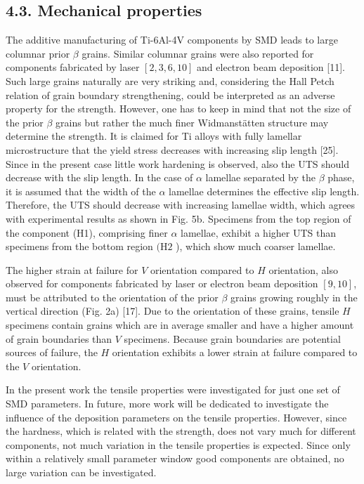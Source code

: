 \documentclass[10pt]{article}
\begin{document}
\subsection*{4.3. Mechanical properties}
The additive manufacturing of Ti-6Al-4V components by SMD leads to large columnar prior $\beta$ grains. Similar columnar grains were also reported for components fabricated by laser $[2,3,6,10]$ and electron beam deposition [11]. Such large grains naturally are very striking and, considering the Hall Petch relation of grain boundary strengthening, could be interpreted as an adverse property for the strength. However, one has to keep in mind that not the size of the prior $\beta$ grains but rather the much finer Widmanstätten structure may determine the strength. It is claimed for Ti alloys with fully lamellar microstructure that the yield stress decreases with increasing slip length [25]. Since in the present case little work hardening is observed, also the UTS should decrease with the slip length. In the case of $\alpha$ lamellae separated by the $\beta$ phase, it is assumed that the width of the $\alpha$ lamellae determines the effective slip length. Therefore, the UTS should decrease with increasing lamellae width, which agrees with experimental results as shown in Fig. 5b. Specimens from the top region of the component (H1), comprising finer $\alpha$ lamellae, exhibit a higher UTS than specimens from the bottom region $(\mathrm{H} 2$ ), which show much coarser lamellae.

The higher strain at failure for $V$ orientation compared to $H$ orientation, also observed for components fabricated by laser or electron beam deposition $[9,10]$, must be attributed to the orientation of the prior $\beta$ grains growing roughly in the vertical direction (Fig. 2a) [17]. Due to the orientation of these grains, tensile $H$ specimens contain grains which are in average smaller and have a higher amount of grain boundaries than $V$ specimens. Because grain boundaries are potential sources of failure, the $H$ orientation exhibits a lower strain at failure compared to the $V$ orientation.

In the present work the tensile properties were investigated for just one set of SMD parameters. In future, more work will be dedicated to investigate the influence of the deposition parameters on the tensile properties. However, since the hardness, which is related with the strength, does not vary much for different components, not much variation in the tensile properties is expected. Since only within a relatively small parameter window good components are obtained, no large variation can be investigated.
\end{document}
